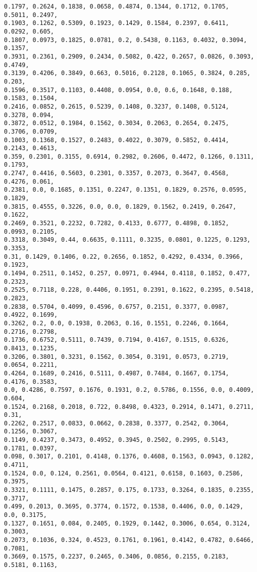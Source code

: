 \documentclass[11pt]{article}
\begin{document}
\begin{Verbatim}[commandchars=\\\{\}]
0.1797, 0.2624, 0.1838, 0.0658, 0.4874, 0.1344, 0.1712, 0.1705, 0.5011, 0.2497,
0.1903, 0.1262, 0.5309, 0.1923, 0.1429, 0.1584, 0.2397, 0.6411, 0.0292, 0.605,
0.1807, 0.0973, 0.1825, 0.0781, 0.2, 0.5438, 0.1163, 0.4032, 0.3094, 0.1357,
0.3931, 0.2361, 0.2909, 0.2434, 0.5082, 0.422, 0.2657, 0.0826, 0.3093, 0.4749,
0.3139, 0.4206, 0.3849, 0.663, 0.5016, 0.2128, 0.1065, 0.3824, 0.285, 0.203,
0.1596, 0.3517, 0.1103, 0.4408, 0.0954, 0.0, 0.6, 0.1648, 0.188, 0.1583, 0.1504,
0.2416, 0.0852, 0.2615, 0.5239, 0.1408, 0.3237, 0.1408, 0.5124, 0.3278, 0.094,
0.3872, 0.0512, 0.1984, 0.1562, 0.3034, 0.2063, 0.2654, 0.2475, 0.3706, 0.0709,
0.1003, 0.1368, 0.1527, 0.2483, 0.4022, 0.3079, 0.5852, 0.4414, 0.2143, 0.4613,
0.359, 0.2301, 0.3155, 0.6914, 0.2982, 0.2606, 0.4472, 0.1266, 0.1311, 0.1793,
0.2747, 0.4416, 0.5603, 0.2301, 0.3357, 0.2073, 0.3647, 0.4568, 0.4276, 0.061,
0.2381, 0.0, 0.1685, 0.1351, 0.2247, 0.1351, 0.1829, 0.2576, 0.0595, 0.1829,
0.3815, 0.4555, 0.3226, 0.0, 0.0, 0.1829, 0.1562, 0.2419, 0.2647, 0.1622,
0.2469, 0.3521, 0.2232, 0.7282, 0.4133, 0.6777, 0.4898, 0.1852, 0.0993, 0.2105,
0.3318, 0.3049, 0.44, 0.6635, 0.1111, 0.3235, 0.0801, 0.1225, 0.1293, 0.3353,
0.31, 0.1429, 0.1406, 0.22, 0.2656, 0.1852, 0.4292, 0.4334, 0.3966, 0.1923,
0.1494, 0.2511, 0.1452, 0.257, 0.0971, 0.4944, 0.4118, 0.1852, 0.477, 0.2323,
0.2525, 0.7118, 0.228, 0.4406, 0.1951, 0.2391, 0.1622, 0.2395, 0.5418, 0.2823,
0.2838, 0.5704, 0.4099, 0.4596, 0.6757, 0.2151, 0.3377, 0.0987, 0.4922, 0.1699,
0.3262, 0.2, 0.0, 0.1938, 0.2063, 0.16, 0.1551, 0.2246, 0.1664, 0.2716, 0.2798,
0.1736, 0.6752, 0.5111, 0.7439, 0.7194, 0.4167, 0.1515, 0.6326, 0.8413, 0.1235,
0.3206, 0.3801, 0.3231, 0.1562, 0.3054, 0.3191, 0.0573, 0.2719, 0.0654, 0.2211,
0.4264, 0.1689, 0.2416, 0.5111, 0.4987, 0.7484, 0.1667, 0.1754, 0.4176, 0.3583,
0.0, 0.4286, 0.7597, 0.1676, 0.1931, 0.2, 0.5786, 0.1556, 0.0, 0.4009, 0.604,
0.1524, 0.2168, 0.2018, 0.722, 0.8498, 0.4323, 0.2914, 0.1471, 0.2711, 0.31,
0.2262, 0.2517, 0.0833, 0.0662, 0.2838, 0.3377, 0.2542, 0.3064, 0.1256, 0.3067,
0.1149, 0.4237, 0.3473, 0.4952, 0.3945, 0.2502, 0.2995, 0.5143, 0.1781, 0.0397,
0.098, 0.3017, 0.2101, 0.4148, 0.1376, 0.4608, 0.1563, 0.0943, 0.1282, 0.4711,
0.1524, 0.0, 0.124, 0.2561, 0.0564, 0.4121, 0.6158, 0.1603, 0.2586, 0.3975,
0.3321, 0.1111, 0.1475, 0.2857, 0.175, 0.1733, 0.3264, 0.1835, 0.2355, 0.3717,
0.499, 0.2013, 0.3695, 0.3774, 0.1572, 0.1538, 0.4406, 0.0, 0.1429, 0.0, 0.3175,
0.1327, 0.1651, 0.084, 0.2405, 0.1929, 0.1442, 0.3006, 0.654, 0.3124, 0.3003,
0.2073, 0.1036, 0.324, 0.4523, 0.1761, 0.1961, 0.4142, 0.4782, 0.6466, 0.7081,
0.3669, 0.1575, 0.2237, 0.2465, 0.3406, 0.0856, 0.2155, 0.2183, 0.5181, 0.1163,

\end{Verbatim}
\end{document}
